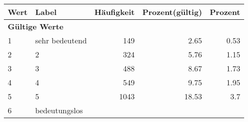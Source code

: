     \begin{longtable}{lXrrr}
     \toprule
     \textbf{Wert} & \textbf{Label} & \textbf{Häufigkeit} & \textbf{Prozent(gültig)} & \textbf{Prozent} \\
     \endhead
     \midrule
     \multicolumn{5}{l}{\textbf{Gültige Werte}}\\

     1 &
     \multicolumn{1}{X}{ sehr bedeutend   } &


       \num{149} &
       \num[round-mode=places,round-precision=2]{2,65} &
         \num[round-mode=places,round-precision=2]{0,53} \\

     2 &
     \multicolumn{1}{X}{ 2   } &


       \num{324} &
       \num[round-mode=places,round-precision=2]{5,76} &
         \num[round-mode=places,round-precision=2]{1,15} \\

     3 &
     \multicolumn{1}{X}{ 3   } &


       \num{488} &
       \num[round-mode=places,round-precision=2]{8,67} &
         \num[round-mode=places,round-precision=2]{1,73} \\

     4 &
     \multicolumn{1}{X}{ 4   } &


       \num{549} &
       \num[round-mode=places,round-precision=2]{9,75} &
         \num[round-mode=places,round-precision=2]{1,95} \\

     5 &
     \multicolumn{1}{X}{ 5   } &


       \num{1043} &
       \num[round-mode=places,round-precision=2]{18,53} &
         \num[round-mode=places,round-precision=2]{3,7} \\

     6 &
     \multicolumn{1}{X}{ bedeutungslos   } &



\end{longtable}
